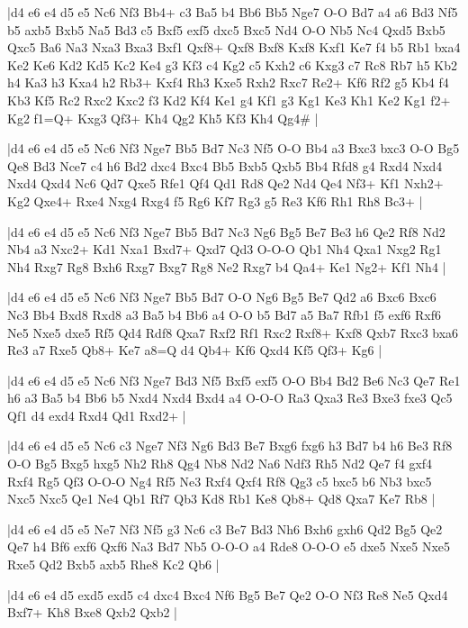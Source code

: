 \whitename{}
\blackname{}
\makegametitle
|d4 e6 e4 d5 e5 Nc6 Nf3 Bb4+ c3 Ba5 b4 Bb6 Bb5 Nge7 O-O Bd7 a4 a6 Bd3 Nf5 b5 axb5 Bxb5 Na5 Bd3 c5 Bxf5 exf5 dxc5 Bxc5 Nd4 O-O Nb5 Nc4 Qxd5 Bxb5 Qxc5 Ba6 Na3 Nxa3 Bxa3 Bxf1 Qxf8+ Qxf8 Bxf8 Kxf8 Kxf1 Ke7 f4 b5 Rb1 bxa4 Ke2 Ke6 Kd2 Kd5 Kc2 Ke4 g3 Kf3 c4 Kg2 c5 Kxh2 c6 Kxg3 c7 Rc8 Rb7 h5 Kb2 h4 Ka3 h3 Kxa4 h2 Rb3+ Kxf4 Rh3 Kxe5 Rxh2 Rxc7 Re2+ Kf6 Rf2 g5 Kb4 f4 Kb3 Kf5 Rc2 Rxc2 Kxc2 f3 Kd2 Kf4 Ke1 g4 Kf1 g3 Kg1 Ke3 Kh1 Ke2 Kg1 f2+ Kg2 f1=Q+ Kxg3 Qf3+ Kh4 Qg2 Kh5 Kf3 Kh4 Qg4\#  |

\whitename{}
\blackname{}
\makegametitle
|d4 e6 e4 d5 e5 Nc6 Nf3 Nge7 Bb5 Bd7 Nc3 Nf5 O-O Bb4 a3 Bxc3 bxc3 O-O Bg5 Qe8 Bd3 Nce7 c4 h6 Bd2 dxc4 Bxc4 Bb5 Bxb5 Qxb5 Bb4 Rfd8 g4 Rxd4 Nxd4 Nxd4 Qxd4 Nc6 Qd7 Qxe5 Rfe1 Qf4 Qd1 Rd8 Qe2 Nd4 Qe4 Nf3+ Kf1 Nxh2+ Kg2 Qxe4+ Rxe4 Nxg4 Rxg4 f5 Rg6 Kf7 Rg3 g5 Re3 Kf6 Rh1 Rh8 Bc3+  |

\whitename{}
\blackname{}
\makegametitle
|d4 e6 e4 d5 e5 Nc6 Nf3 Nge7 Bb5 Bd7 Nc3 Ng6 Bg5 Be7 Be3 h6 Qe2 Rf8 Nd2 Nb4 a3 Nxc2+ Kd1 Nxa1 Bxd7+ Qxd7 Qd3 O-O-O Qb1 Nh4 Qxa1 Nxg2 Rg1 Nh4 Rxg7 Rg8 Bxh6 Rxg7 Bxg7 Rg8 Ne2 Rxg7 b4 Qa4+ Ke1 Ng2+ Kf1 Nh4  |

\whitename{}
\blackname{}
\makegametitle
|d4 e6 e4 d5 e5 Nc6 Nf3 Nge7 Bb5 Bd7 O-O Ng6 Bg5 Be7 Qd2 a6 Bxc6 Bxc6 Nc3 Bb4 Bxd8 Rxd8 a3 Ba5 b4 Bb6 a4 O-O b5 Bd7 a5 Ba7 Rfb1 f5 exf6 Rxf6 Ne5 Nxe5 dxe5 Rf5 Qd4 Rdf8 Qxa7 Rxf2 Rf1 Rxc2 Rxf8+ Kxf8 Qxb7 Rxc3 bxa6 Re3 a7 Rxe5 Qb8+ Ke7 a8=Q d4 Qb4+ Kf6 Qxd4 Kf5 Qf3+ Kg6  |

\whitename{}
\blackname{}
\makegametitle
|d4 e6 e4 d5 e5 Nc6 Nf3 Nge7 Bd3 Nf5 Bxf5 exf5 O-O Bb4 Bd2 Be6 Nc3 Qe7 Re1 h6 a3 Ba5 b4 Bb6 b5 Nxd4 Nxd4 Bxd4 a4 O-O-O Ra3 Qxa3 Re3 Bxe3 fxe3 Qc5 Qf1 d4 exd4 Rxd4 Qd1 Rxd2+  |

\whitename{}
\blackname{}
\makegametitle
|d4 e6 e4 d5 e5 Nc6 c3 Nge7 Nf3 Ng6 Bd3 Be7 Bxg6 fxg6 h3 Bd7 b4 h6 Be3 Rf8 O-O Bg5 Bxg5 hxg5 Nh2 Rh8 Qg4 Nb8 Nd2 Na6 Ndf3 Rh5 Nd2 Qe7 f4 gxf4 Rxf4 Rg5 Qf3 O-O-O Ng4 Rf5 Ne3 Rxf4 Qxf4 Rf8 Qg3 c5 bxc5 b6 Nb3 bxc5 Nxc5 Nxc5 Qe1 Ne4 Qb1 Rf7 Qb3 Kd8 Rb1 Ke8 Qb8+ Qd8 Qxa7 Ke7 Rb8  |

\whitename{}
\blackname{}
\makegametitle
|d4 e6 e4 d5 e5 Ne7 Nf3 Nf5 g3 Nc6 c3 Be7 Bd3 Nh6 Bxh6 gxh6 Qd2 Bg5 Qe2 Qe7 h4 Bf6 exf6 Qxf6 Na3 Bd7 Nb5 O-O-O a4 Rde8 O-O-O e5 dxe5 Nxe5 Nxe5 Rxe5 Qd2 Bxb5 axb5 Rhe8 Kc2 Qb6  |

\whitename{}
\blackname{}
\makegametitle
|d4 e6 e4 d5 exd5 exd5 c4 dxc4 Bxc4 Nf6 Bg5 Be7 Qe2 O-O Nf3 Re8 Ne5 Qxd4 Bxf7+ Kh8 Bxe8 Qxb2 Qxb2  |

